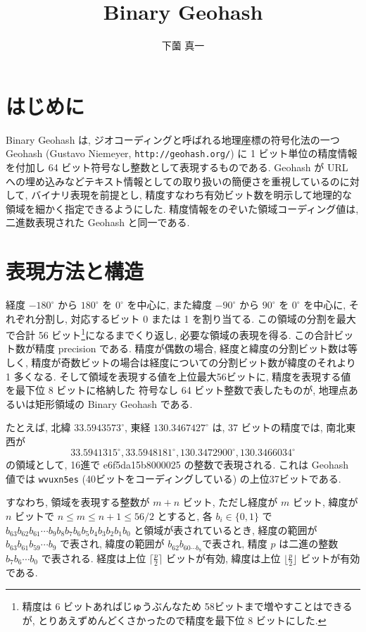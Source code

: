 \documentclass[11pt]{jsarticle}
\title{Binary Geohash}
\author{下薗 真一}
\date{}
\begin{document}
\maketitle

\section{はじめに}
Binary Geohash は, ジオコーディングと呼ばれる地理座標の符号化法の一つ Geohash (Gustavo Niemeyer, {\tt http://geohash.org/}) に 1 ビット単位の精度情報を付加し 64 ビット符号なし整数として表現するものである. 
Geohash が URL への埋め込みなどテキスト情報としての取り扱いの簡便さを重視しているのに対して, 
バイナリ表現を前提とし, 精度すなわち有効ビット数を明示して地理的な領域を細かく指定できるようにした. 
精度情報をのぞいた領域コーディング値は, 二進数表現された Geohash と同一である. 

\section{表現方法と構造}
経度 $-180^\circ$ から $180^\circ$ を $0^\circ$ を中心に, 
また緯度 $-90^\circ$ から $90^\circ$ を $0^\circ$ を中心に, 
それぞれ分割し, 対応するビット 0 または 1 を割り当てる. 
この領域の分割を最大で合計 56 ビット\footnote{精度は 6 ビットあればじゅうぶんなため 58ビットまで増やすことはできるが, とりあえずめんどくさかったので精度を最下位 8 ビットにした. }になるまでくり返し, 必要な領域の表現を得る. 
この合計ビット数が精度 precision である. 
精度が偶数の場合, 経度と緯度の分割ビット数は等しく, 精度が奇数ビットの場合は経度についての分割ビット数が緯度のそれより 1 多くなる. 
そして領域を表現する値を上位最大56ビットに, 精度を表現する値を最下位 8 ビットに格納した
符号なし 64 ビット整数で表したものが, 地理点あるいは矩形領域の Binary Geohash である. 

たとえば, 北緯 $33.5943573^\circ$, 東経 $130.3467427^\circ$ は, 37 ビットの精度では, 
南北東西が
\[33.5941315^\circ, 33.5948181^\circ, 130.3472900^\circ, 130.3466034^\circ \] 
の領域として, 16進で e6f5da15b8000025 の整数で表現される. 
これは Geohash 値では {\tt wvuxn5es} (40ビットをコーディングしている) の上位37ビットである. 

すなわち, 領域を表現する整数が $m + n$ ビット, ただし経度が $m$ ビット, 緯度が $n$ ビットで $n \leq m \leq n+1 \leq 56/2$ とすると, 各 $b_i \in \{0, 1\}$ で
$b_{63} b_{62} b_{61} \cdots b_9 b_8 b_7 b_6 b_5 b_4 b_3 b_2 b_1 b_0$ と領域が表されているとき, 
経度の範囲が $b_{63} b_{61} b_{59} \cdots b_9$ で表され, 
緯度の範囲が $b_{62} b_{60 \cdots b_8} で表され$, 
精度 $p$ は二進の整数 $b_7 b_6 \cdots b_0$ で表される. 
経度は上位 $\lceil{\frac{p}{2}}\rceil$ ビットが有効, 
緯度は上位 $\lfloor{\frac{p}{2}}\rfloor$ ビットが有効である. 
\end{document}
